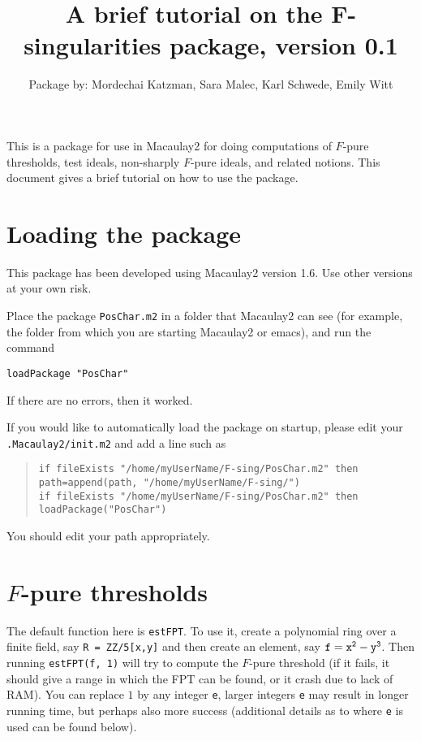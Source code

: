 \documentclass[11pt,fullpage]{amsart}
\theoremstyle{definition}
\theoremstyle{remark}
\begin{document}
\title{A brief tutorial on the F-singularities package, version 0.1}
\author{Package by:  Mordechai Katzman, Sara Malec, Karl Schwede, Emily Witt}

\maketitle

This is a package for use in Macaulay2 for doing computations of $F$-pure thresholds, test ideals, non-sharply $F$-pure ideals, and related notions.  This document gives a brief tutorial on how to use the package.

\section{Loading the package}

This package has been developed using Macaulay2 version 1.6.  Use other versions at your own risk.

Place the package {\tt PosChar.m2} in a folder that Macaulay2 can see (for example, the folder from which you are starting Macaulay2 or emacs), and run the command \begin{center}{\tt loadPackage "PosChar"}  \end{center}
If there are no errors, then it worked.

If you would like to automatically load the package on startup, please edit your {\tt .Macaulay2/init.m2} and add a line such as
\begin{quotation}
{\tt if fileExists "/home/myUserName/F-sing/PosChar.m2" then path=append(path, "/home/myUserName/F-sing/")}\\
{\tt  if fileExists "/home/myUserName/F-sing/PosChar.m2" then loadPackage("PosChar")}
\end{quotation}
You should edit your path appropriately.


\section{$F$-pure thresholds}

The default function here is {\tt estFPT}.  To use it, create a polynomial ring over a finite field, say {\tt R = ZZ/5[x,y]} and then create an element, say ${\tt f  = x^2 - y^3 }$.  Then running {\tt estFPT(f, 1)} will try to compute the $F$-pure threshold (if it fails, it should give a range in which the FPT can be found, or it crash due to lack of RAM).  You can replace $1$ by any integer {\tt e}, larger integers {\tt e} may result in longer running time, but perhaps also more success (additional details as to where {\tt e} is used can be found below).
\end{document}
